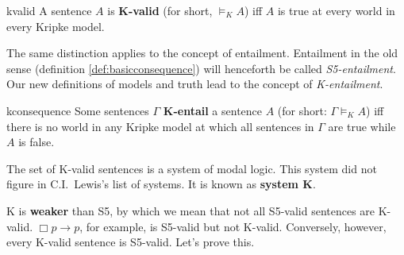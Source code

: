 \begin{definition}{}{kvalid}
  A sentence $A$ is \textbf{K-valid} (for short, $\models_K A$) iff $A$
  is true at every world in every Kripke model.
\end{definition}


The same distinction applies to the concept of entailment. Entailment in the old
sense (definition \ref{def:basicconsequence}) will henceforth be called
\emph{S5-entailment}. Our new definitions of models and truth lead to the
concept of \emph{K-entailment}.

\begin{definition}{}{kconsequence}
  Some sentences $\Gamma$ \textbf{K-entail} a sentence $A$ (for short:
  $\Gamma \models_{K} A$) iff there is no world in any Kripke model at which all
  sentences in $\Gamma$ are true while $A$ is false.
\end{definition}

The set of K-valid sentences is a system of modal logic. This system did
not figure in C.I.\ Lewis's list of systems. It is known as \textbf{system K}.

K is \textbf{weaker} than S5, by which we mean that not all S5-valid
sentences are K-valid. $\Box p \to p$, for example, is S5-valid but not K-valid.
Conversely, however, every K-valid sentence is S5-valid. Let's prove this.

